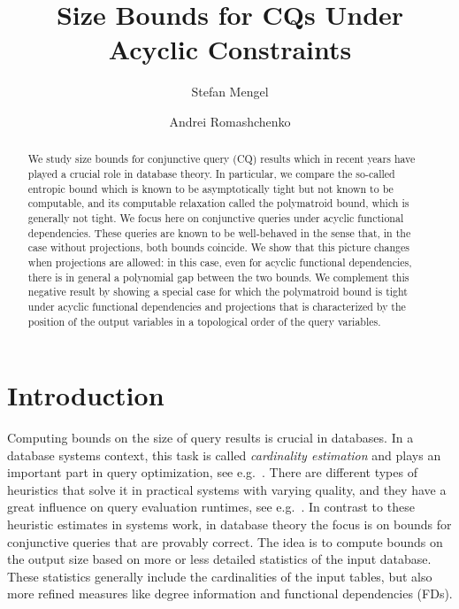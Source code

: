 \documentclass[a4paper,cleveref]{lipics-v2021}
\title{Size Bounds for CQs Under Acyclic Constraints}
\author{Stefan Mengel}{Univ.~Artois, CNRS, Centre de Recherche en Informatique de Lens (CRIL), Lens, France}{mengel@cril.fr}{https://orcid.org/0000-0003-1386-8784}
{}
\author{Andrei Romashchenko}{LIRMM Univ Montpellier \& CNRS, France}{andrei.romashchenko@lirmm.fr}{https://orcid.org/0000-0001-7723-7880}{}
\begin{document}
\maketitle
%

\begin{abstract}
We study size bounds for conjunctive query (CQ) 
results which in recent years have played a crucial role in database theory. In particular, we compare the so-called entropic bound which is known to be asymptotically tight but not known to be computable, and its computable relaxation called the polymatroid bound,  which is generally not tight. We focus here on conjunctive queries under acyclic functional dependencies. These queries are known to be well-behaved in the sense that, in the case without projections, both bounds coincide. We show that this picture changes when projections are allowed: in this case, even for acyclic functional dependencies, there is in general a polynomial gap between the two bounds. We complement this negative result by showing a special case for which the polymatroid bound is tight under acyclic functional dependencies and projections that is characterized by the position of the output variables in a topological order of the query variables.
\end{abstract}

\section{Introduction}\label{sec:acyclic}

Computing bounds on the size of query results is crucial in databases. In a database systems context, this task is called \emph{cardinality estimation} and plays an important  part in query optimization, see e.g.~\cite{selinger1979access,leis2015good}. There are different types of heuristics that solve it in practical systems with varying quality, and they have a great influence on query evaluation runtimes, see e.g.~\cite{leis2015good,ZhangMKOS25}.
In contrast to these heuristic estimates in systems work, in database theory the focus is on bounds for conjunctive queries that are provably correct. The idea is to compute bounds on the output size based on more or less detailed statistics of the input database. These statistics generally include the cardinalities of the input tables, but also more refined measures like degree information and functional dependencies (FDs).
\end{document}

